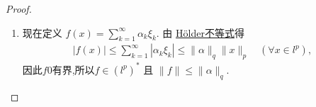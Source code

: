 \documentclass[../../main.tex]{subfiles}%
\begin{document}
\begin{proof}
\begin{enumerate}[(1)]
\begin{align*}
\end{align*}
进而
\begin{align}\label{eq::jsijjjj-2}
\left\| f_n \right\| =\underset{x\in l^p}{\mathrm{sup}}\frac{\left| f_n\left( x \right) \right|}{\left\| x \right\| _p}\geqslant \left( \sum\limits_{k=1}^n{\left| \alpha _k \right|^q} \right) ^{\frac{1}{q}}.
\end{align}
因此由\eqref{eq::jsijjjj-1}\eqref{eq::jsijjjj-2}式知
\begin{align}\label{eq:fnorm}
\|f_n\|=\Bigl(\sum\limits_{k=1}^{n}|\alpha_k|^q\Bigr)^{\frac{1}{q}}.
\end{align}
依题设, 对每个 $x\in l^p$, $\lim\limits_{n\to\infty}f_n(x)=\sum\limits_{k=1}^{\infty}\alpha_k\xi_k$ 存在, 从而 $\{|f_n(x)|\}$ 有界. 由\hyperref[theorem:泛函分析--共鸣定理]{共鸣定理}, 存在常数 $M>0$ 使得 $\|f_n\|\leqslant M$ 对一切 $n$ 成立. 根据 \eqref{eq:fnorm}式即得
\begin{align*}
\Bigl(\sum\limits_{k=1}^{n}|\alpha_k|^q\Bigr)^{\frac{1}{q}}\leqslant M\quad \forall n\in \mathbb{N}.
\end{align*}
令 $n\to\infty$ 便知 $\{\alpha_k\}\in l^q$, 且 $\|\alpha\|_q\triangleq\bigl(\sum_{k=1}^{\infty}|\alpha_k|^q\bigr)^{\frac{1}{q}}\leqslant M$.

\item 现在定义 $f(x)=\sum\limits_{k=1}^{\infty}\alpha_k\xi_k$. 由 \hyperref[Real Analysis-theorem:实变函数--Hölder不等式]{H\"{o}lder不等式}得
\begin{align*}
|f(x)|\leqslant \sum\limits_{k=1}^{\infty}|\alpha_k\xi_k|
\leqslant \|\alpha\|_q\|x\|_p\quad (\forall x\in l^p),
\end{align*}
因此$f$0有界,所以$f\in (l^p)^*$ 且 $\|f\|\leqslant \|\alpha\|_q$.


\end{enumerate}
\end{proof}
\end{document}
